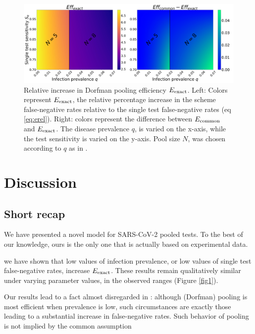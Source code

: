 \documentclass{article}
\begin{document}
\begin{figure}[H]
  \centering
  \includegraphics[width=18cm]{heatmap_efficiency.jpg}
  \caption{Relative increase in Dorfman pooling efficiency
    $E_{\text{{exact}}}$. Left: Colors represent $E_{\text{{exact}}}$, the relative
    percentage increase in the scheme false-negative rates relative
    to the single test false-negative rates (eq
    \eqref{eq:erel}). Right: colors represent the difference between
    $E_{\text{{common}}}$ and $E_{\text{{exact}}}$. The disease prevalence $q$, is
    varied on the x-axis, while the test sensitivity is varied on
    the y-axis. Pool size $N$, was chosen according to $q$ as in
    \cite{DorfmanYuvalDor}.}\label{fig2}
\end{figure}



\section{Discussion}

\subsection{Short recap}
We have presented a novel model for SARS-CoV-2 pooled tests. To the best of our knowledge, ours is the
only one that is actually based on experimental data.

we have shown that low values of infection prevalence, or
low values of single test false-negative rates, increase
$E_{\text{{exact}}}$. These results remain qualitatively similar under varying
parameter values, in the observed ranges
\cite{KitComparison,EstimatingRatesKucrika, EstimatingRatesLourenco,
  InterpretingCOVID19Test} (Figure \ref{fig1}).

Our results lead to a fact almost disregarded in
\cite{DorfmanYuvalDor}: although (Dorfman) pooling is most efficient
when prevalence is low, such circumstances are exactly those leading
to a substantial increase in false-negative rates. Such behavior of
pooling is not implied by the common assumption
\end{document}
